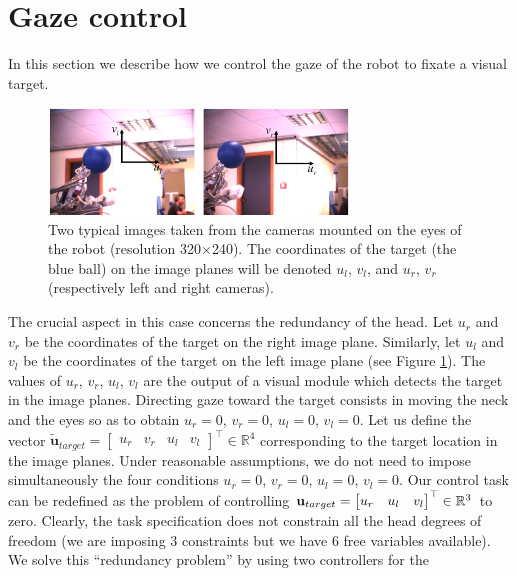 \section{Gaze control}
\label{Sec:gazecontrol}

In this section we describe how we control the gaze of the robot to
fixate a visual target.
%
\begin{figure}[tbp]
\centering
\includegraphics[width=8cm]{Figure/hand.eps}
\caption{Two typical images taken from the cameras mounted on the 
eyes of the robot (resolution 320$\times$240).
The coordinates of the target (the blue ball) on the image planes
will be denoted $u_l$, $v_l$, and $u_r$, $v_r$ (respectively left 
and right cameras).}
\label{Fig:ImagePlane}
\end{figure}
% 
The crucial aspect in this case concerns the redundancy of the 
head. Let $u_r$ and $v_r$ be the coordinates of the target on the 
right image plane. Similarly, let $u_l$ and $v_l$ be the coordinates 
of the target on the 
left image plane (see Figure \ref{Fig:ImagePlane}). The values of $u_r$, 
$v_r$, $u_l$, $v_l$ are the output of a visual module which detects the
target in the image planes. Directing gaze 
toward the target 
consists in moving the neck and the eyes so as to obtain 
$u_r=0$, $v_r=0$, $u_l=0$, $v_l=0$. 
Let us define the vector 
$\tilde {\mathbf u}_{target}= \begin{bmatrix} u_r & v_r & u_l & v_l 
\end{bmatrix}^\top \in \mathbb R^4$ corresponding to the 
target location in the image planes. Under reasonable 
assumptions, we do not need to impose simultaneously 
the four conditions $u_r=0$, $v_r=0$, $u_l=0$, $v_l=0$.  Our control task 
can be redefined as the problem of controlling 
$\mathbf{u}_{target} = \begin{bmatrix} u_r & u_l & v_l \end{bmatrix}^\top \in \mathbb R^3$ 
to zero. Clearly, the task specification does not constrain all the head 
degrees of freedom (we are imposing $3$ constraints but we 
have $6$ free variables available). 
We solve this ``redundancy problem'' by using two controllers for the 

